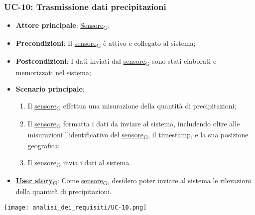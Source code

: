 \subsubsection{UC-10: Trasmissione dati precipitazioni}
\begin{itemize}
	\item \textbf{Attore principale}: \href{https://7last.github.io/docs/rtb/documentazione-interna/glossario\#sensore}{Sensore\textsubscript{G}};
	\item \textbf{Precondizioni}: Il \href{https://7last.github.io/docs/rtb/documentazione-interna/glossario\#sensore}{sensore\textsubscript{G}} è attivo e collegato al sistema;
	\item \textbf{Postcondizioni}: I dati inviati dal \href{https://7last.github.io/docs/rtb/documentazione-interna/glossario\#sensore}{sensore\textsubscript{G}} sono stati elaborati e memorizzati nel sistema;
	\item \textbf{Scenario principale}:
	      \begin{enumerate}
		      \item Il \href{https://7last.github.io/docs/rtb/documentazione-interna/glossario\#sensore}{sensore\textsubscript{G}} effettua una misurazione della quantità di precipitazioni;
		      \item Il \href{https://7last.github.io/docs/rtb/documentazione-interna/glossario\#sensore}{sensore\textsubscript{G}} formatta i dati da inviare al sistema, includendo oltre alle misurazioni l'identificativo del \href{https://7last.github.io/docs/rtb/documentazione-interna/glossario\#sensore}{sensore\textsubscript{G}},
		            il timestamp, e la sua posizione geografica;
		      \item Il \href{https://7last.github.io/docs/rtb/documentazione-interna/glossario\#sensore}{sensore\textsubscript{G}} invia i dati al sistema.
	      \end{enumerate}
	\item \href{https://7last.github.io/docs/rtb/documentazione-interna/glossario\#user-story}{\textbf{User story}\textsubscript{G}}: Come \href{https://7last.github.io/docs/rtb/documentazione-interna/glossario\#sensore}{sensore\textsubscript{G}}, desidero poter inviare al sistema le rilevazioni della quantità di precipitazioni.
\end{itemize}

\begin{center}
	\texttt{[image: analisi\_dei\_requisiti/UC-10.png]}
\end{center}

